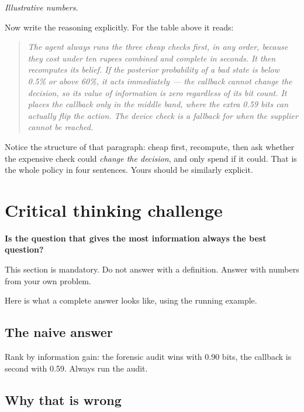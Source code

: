 \documentclass[11pt,a4paper]{article}
\begin{document}
\emph{Illustrative numbers.}

Now write the reasoning explicitly. For the table above it reads:

\begin{quote}\itshape
The agent always runs the three cheap checks first, in any order, because they cost under ten
rupees combined and complete in seconds. It then recomputes its belief. If the posterior
probability of a bad state is below 0.5\% or above 60\%, it acts immediately --- the callback
cannot change the decision, so its value of information is zero regardless of its bit count. It
places the callback only in the middle band, where the extra 0.59 bits can actually flip the
action. The device check is a fallback for when the supplier cannot be reached.
\end{quote}

Notice the structure of that paragraph: cheap first, recompute, then ask whether the expensive
check could \emph{change the decision}, and only spend if it could. That is the whole policy in
four sentences. Yours should be similarly explicit.

\section{Critical thinking challenge}
\label{sec:challenge}

\begin{sbrule}
\textbf{Is the question that gives the most information always the best question?}
\end{sbrule}

This section is mandatory. Do not answer with a definition. Answer with numbers from your own
problem.

Here is what a complete answer looks like, using the running example.

\subsection{The naive answer}

Rank by information gain: the forensic audit wins with 0.90 bits, the callback is second with
0.59. Always run the audit.

\subsection{Why that is wrong}
\end{document}
